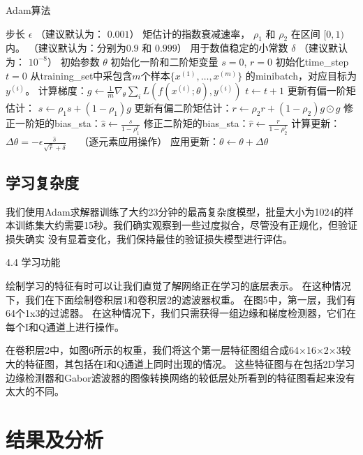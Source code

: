 \begin{algorithm}[ht]
	\caption{Adam算法}
	\label{alg:adam}
	\begin{algorithmic}
		\REQUIRE 步长 $\epsilon$ （建议默认为： $0.001$）
		\REQUIRE 矩估计的指数衰减速率， $\rho_1$ 和 $\rho_2$ 在区间 $[0, 1)$内。
		（建议默认为：分别为$0.9$ 和 $0.999$）
		\REQUIRE 用于数值稳定的小常数 $\delta$  （建议默认为： $10^{-8}$）
		\REQUIRE 初始参数 $\theta$
		\STATE 初始化一阶和二阶矩变量 $s = 0 $, $r = 0$
		\STATE 初始化\gls{time_step} $t=0$ 
		\STATE 从\gls{training_set}中采包含$m$个样本$\{ x^{(1)},\dots, x^{(m)}\}$ 的\gls{minibatch}，对应目标为$y^{(i)}$。
		\STATE 计算梯度：$g \leftarrow \frac{1}{m} \nabla_{\theta} \sum_i L(f(x^{(i)};\theta),y^{(i)})$ 
		\STATE $t \leftarrow t + 1$
		\STATE 更新有偏一阶矩估计： $s \leftarrow \rho_1 s + (1-\rho_1) g$
		\STATE 更新有偏二阶矩估计：$r \leftarrow \rho_2 r + (1-\rho_2)  g \odot g$
		\STATE 修正一阶矩的\gls{bias_sta}：$\hat{s} \leftarrow \frac{s}{1-\rho_1^t}$
		\STATE 修正二阶矩的\gls{bias_sta}：$\hat{r} \leftarrow \frac{r}{1-\rho_2^t}$
		\STATE 计算更新：$\Delta \theta = - \epsilon \frac{\hat{s}}{\sqrt{\hat{r}} + \delta}$ \ \  （逐元素应用操作）
		\STATE 应用更新：$\theta \leftarrow \theta + \Delta \theta$
		\ENDWHILE
	\end{algorithmic}
\end{algorithm}

\subsection{学习复杂度}
我们使用Adam求解器训练了大约23分钟的最高复杂度模型，批量大小为1024的样本训练集大约需要15秒。我们确实观察到一些过度拟合，尽管没有正规化，但验证损失确实 没有显着变化，我们保持最佳的验证损失模型进行评估。\par
4.4 学习功能 \par
绘制学习的特征有时可以让我们直觉了解网络正在学习的底层表示。 在这种情况下，我们在下面绘制卷积层1和卷积层2的滤波器权重。 在图5中，第一层，我们有64个1x3的过滤器。 在这种情况下，我们只需获得一组边缘和梯度检测器，它们在每个I和Q通道上进行操作。\par

在卷积层2中，如图6所示的权重，我们将这个第一层特征图组合成64×16×2×3较大的特征图，其包括在I和Q通道上同时出现的情况。 这些特征图与在包括2D学习边缘检测器和Gabor滤波器的图像转换网络的较低层处所看到的特征图看起来没有太大的不同。\par


\section{结果及分析}

